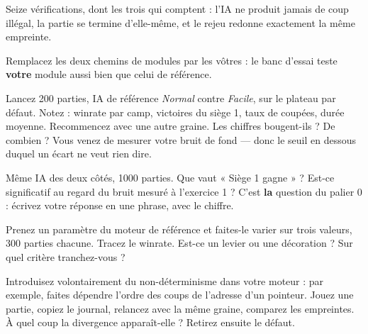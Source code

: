 Seize vérifications, dont les trois qui comptent : l'IA ne produit jamais de coup
illégal, la partie se termine d'elle-même, et le rejeu redonne exactement la même
empreinte.

Remplacez les deux chemins de modules par les vôtres : le banc d'essai teste
\textbf{votre} module aussi bien que celui de référence.

\begin{nkexo}
Lancez 200 parties, IA de référence \emph{Normal} contre \emph{Facile}, sur le
plateau par défaut. Notez : winrate par camp, victoires du siège 1, taux de
coupées, durée moyenne. Recommencez avec une autre graine. Les chiffres
bougent-ils ? De combien ? Vous venez de mesurer votre bruit de fond — donc le
seuil en dessous duquel un écart ne veut rien dire.
\end{nkexo}

\begin{nkexo}
Même IA des deux côtés, 1000 parties. Que vaut « Siège 1 gagne » ? Est-ce
significatif au regard du bruit mesuré à l'exercice 1 ? C'est \textbf{la} question
du palier 0 : écrivez votre réponse en une phrase, avec le chiffre.
\end{nkexo}

\begin{nkexo}
Prenez un paramètre du moteur de référence et faites-le varier sur trois valeurs,
300 parties chacune. Tracez le winrate. Est-ce un levier ou une décoration ? Sur
quel critère tranchez-vous ?
\end{nkexo}

\begin{nkexo}
Introduisez volontairement du non-déterminisme dans votre moteur : par exemple,
faites dépendre l'ordre des coups de l'adresse d'un pointeur. Jouez une partie,
copiez le journal, relancez avec la même graine, comparez les empreintes. À quel
coup la divergence apparaît-elle ? Retirez ensuite le défaut.
\end{nkexo}

